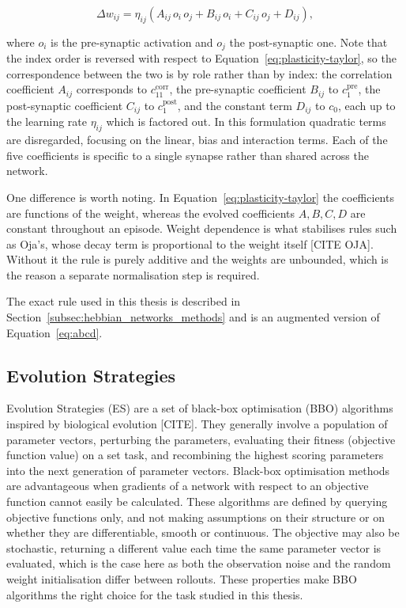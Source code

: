 \documentclass{article} %
\begin{document}
\begin{equation}
    \Delta w_{ij} = \eta_{ij} \left(
        A_{ij}\, o_{i}\, o_{j}
      + B_{ij}\, o_{i}
      + C_{ij}\, o_{j}
      + D_{ij}
    \right),
    \label{eq:abcd}
\end{equation}

where $o_i$ is the pre-synaptic activation and $o_j$ the post-synaptic one.
Note that the index order is reversed with respect to
Equation~\ref{eq:plasticity-taylor}, so the correspondence between the two is
by role rather than by index: the correlation coefficient $A_{ij}$ corresponds
to $c_{11}^{\mathrm{corr}}$, the pre-synaptic coefficient $B_{ij}$ to
$c_1^{\mathrm{pre}}$, the post-synaptic coefficient $C_{ij}$ to
$c_1^{\mathrm{post}}$, and the constant term $D_{ij}$ to $c_0$, each up to the
learning rate $\eta_{ij}$ which is factored out. In this formulation quadratic
terms are disregarded, focusing on the linear, bias and interaction terms. Each
of the five coefficients is specific to a single synapse rather than shared
across the network.

One difference is worth noting. In Equation~\ref{eq:plasticity-taylor} the
coefficients are functions of the weight, whereas the evolved coefficients
$A,B,C,D$ are constant throughout an episode. Weight dependence is what
stabilises rules such as Oja's, whose decay term is proportional to the weight
itself [CITE OJA]. Without it the rule is purely additive and the weights are
unbounded, which is the reason a separate normalisation step is required.

The exact rule used in this thesis is described in
Section~\ref{subsec:hebbian_networks_methods} and is an augmented version of
Equation~\ref{eq:abcd}.


\subsection{Evolution Strategies}
\label{subsec:evolution_strategies}
Evolution Strategies (ES) are a set of black-box optimisation (BBO) algorithms
inspired by biological evolution [CITE]. They generally involve a population of
parameter vectors, perturbing the parameters, evaluating their fitness
(objective function value) on a set task, and recombining the highest scoring
parameters into the next generation of parameter vectors. Black-box
optimisation methods are advantageous when gradients of a network with respect
to an objective function cannot easily be calculated. These algorithms are
defined by querying objective functions only, and not making assumptions on
their structure or on whether they are differentiable, smooth or continuous.
The objective may also be stochastic, returning a different value each time the
same parameter vector is evaluated, which is the case here as both the
observation noise and the random weight initialisation differ between rollouts.
These properties make BBO algorithms the right choice for the task studied in
this thesis.
\end{document}
